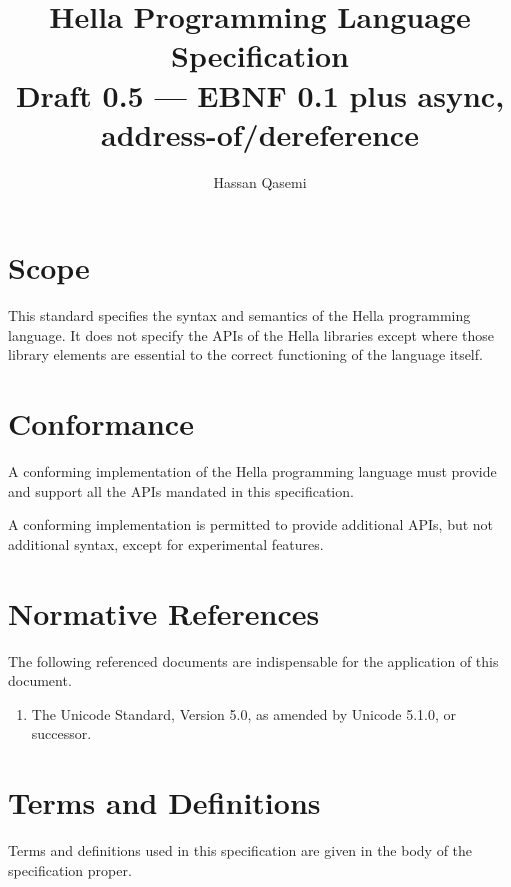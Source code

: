 \documentclass[makeidx]{article}
\title{Hella Programming Language Specification\\
{\large Draft 0.5 --- EBNF 0.1 plus async, address-of/dereference}}
\author{Hassan Qasemi}
\begin{document}
\maketitle
\setlength{\cftsubsecnumwidth}{2.7em}
\setlength{\cftsubsubsecnumwidth}{3.4em}
\tableofcontents
\newpage
\pagestyle{myheadings}

\section{Scope}

\LMHash{}%
This standard specifies the syntax and semantics of
the Hella programming language.
It does not specify the APIs of the Hella libraries
except where those library elements are essential to
the correct functioning of the language itself.

\section{Conformance}

\LMHash{}%
A conforming implementation of the Hella programming language
must provide and support all the APIs
mandated in this specification.

\LMHash{}%
A conforming implementation is permitted to provide additional APIs,
but not additional syntax,
except for experimental features.

\section{Normative References}

\LMHash{}%
The following referenced documents are indispensable for
the application of this document.
\begin{enumerate}
\item
  The Unicode Standard, Version 5.0, as amended by Unicode 5.1.0, or successor.
\end{enumerate}

\section{Terms and Definitions}

\LMHash{}%
Terms and definitions used in this specification are given in
the body of the specification proper.
\end{document}
